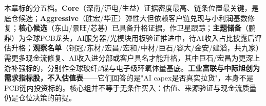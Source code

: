 \begin{houseviewbox}
本章标的分五档。\textbf{Core}（深南/沪电/生益）证据密度最高、链条位置最关键，是底仓候选；\textbf{Aggressive}（胜宏/华正）弹性大但依赖客户链兑现与小利润基数修复；\textbf{核心候选}（东山/景旺/芯碁）已具备升格证据，作卫星跟踪；\textbf{主题储备}（鹏鼎）为全球PCB龙头，AI服务器/光模块用板验证推进中，待AI收入占比披露后评估升格；\textbf{观察名单}（铜冠/东材/宏昌/宏和/中材/巨石/容大/金安/建滔，共九家）需更多现金流修复、AI收入进分部或客户具名才能升格，其中巨石/宏昌为更深上游补强标的，分别作全球玻纤$\beta$锚与电子级环氧体量基底。\textbf{工业富联与中际旭创为需求指标股，不入估值表}——它们回答的是"AI capex是否真实拉货"，本身不是PCB链内投资标的。核心组并不等于无条件买入：估值、来源验证与现金流质量仍是仓位决策的前提。
\end{houseviewbox}
